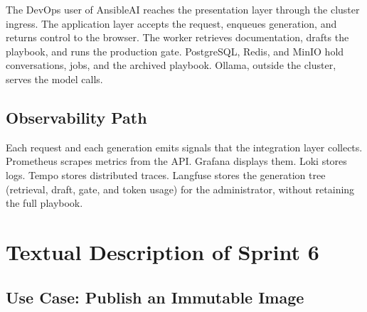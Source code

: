 The DevOps user of AnsibleAI reaches the presentation layer through the cluster ingress. The application layer accepts the request, enqueues generation, and returns control to the browser. The worker retrieves documentation, drafts the playbook, and runs the production gate. PostgreSQL, Redis, and MinIO hold conversations, jobs, and the archived playbook. Ollama, outside the cluster, serves the model calls.

\subsection{Observability Path}

Each request and each generation emits signals that the integration layer collects. Prometheus scrapes metrics from the API. Grafana displays them. Loki stores logs. Tempo stores distributed traces. Langfuse stores the generation tree (retrieval, draft, gate, and token usage) for the administrator, without retaining the full playbook.

\section{Textual Description of Sprint 6}
\label{sec:sprint6-use-cases}

\subsection{Use Case: Publish an Immutable Image}

